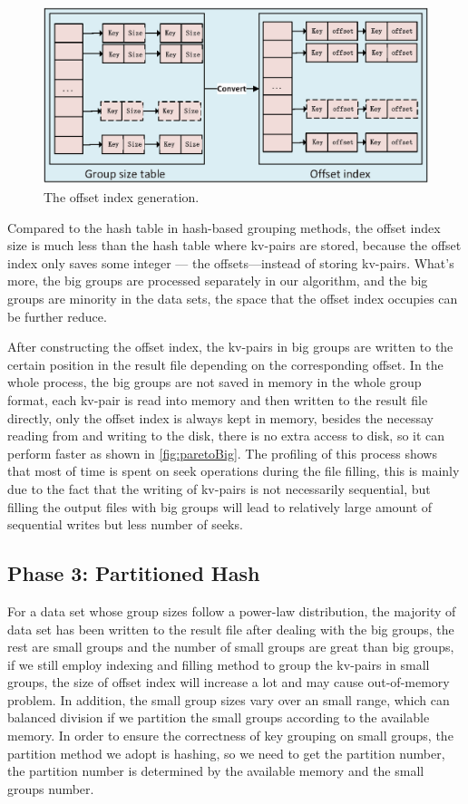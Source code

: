 \begin{figure}
\includegraphics[width=.5\textwidth]{fig/convert}
\caption{The offset index generation.}
\label{fig:convert}
\end{figure}

Compared to the hash table in hash-based grouping methods, the offset index size is much less than the hash table where kv-pairs are stored, because the offset index only saves some integer --- the offsets---instead of storing kv-pairs. What's more, the big groups are processed separately in our algorithm, and the big groups are minority in the data sets, the space that the offset index occupies can be further reduce.
 
After constructing the offset index, the kv-pairs in big groups are written to the certain position in the result file depending on the corresponding offset. In the whole process, the big groups are not saved in memory in the whole group format, each kv-pair is read into memory and then written to the result file directly, only the offset index is always kept in memory, besides the necessay reading from and writing to the disk, there is no extra access to disk, so it can perform faster as shown in \ref{fig:paretoBig}. The profiling of this process shows that most of time is spent on seek operations during the file filling, this is mainly due to the fact that the writing of kv-pairs is not necessarily sequential, but filling the output files with big groups will lead to relatively large amount of sequential writes but less number of seeks.

\subsection{Phase 3: Partitioned Hash}

For a data set whose group sizes follow a power-law distribution, the majority of data set has been written to the result file after dealing with the big groups, the rest are small groups and the number of small groups are great than big groups, if we still employ indexing and filling method to group the kv-pairs in small groups, the size of offset index will increase a lot and may cause out-of-memory problem. In addition, the small group sizes vary over an small range, which can balanced division if we partition the small groups according to the available memory. In order to ensure the correctness of key grouping on small groups, the partition method we adopt is hashing, so we need to get the partition number, the partition number is determined by the available memory and the small groups number. 

